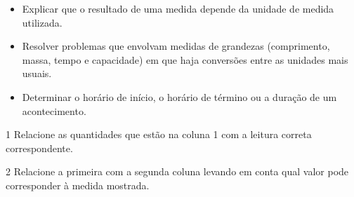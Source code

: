 {\begin{itemize}
\item Explicar que o resultado de uma medida depende da unidade de medida utilizada.

\item Resolver problemas que envolvam medidas de grandezas (comprimento,
massa, tempo e capacidade) em que haja conversões entre as unidades mais
usuais.

\item Determinar o horário de início, o horário de término ou a duração de
um acontecimento.
\end{itemize}




\num{1} Relacione as quantidades que estão na coluna 1 com a leitura correta correspondente.

\begin{multicols}{2}







\end{multicols}



\num{2} Relacione a primeira com a segunda coluna levando em conta qual
valor pode corresponder à medida mostrada.

\begin{multicols}{2}


\end{multicols}}

